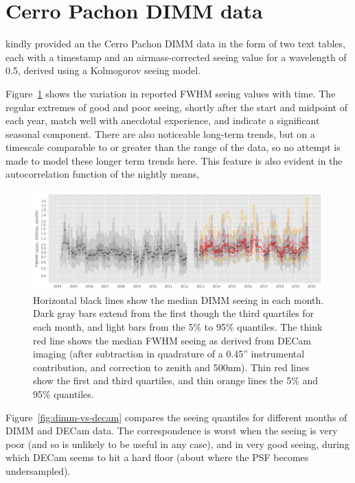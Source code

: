 \documentclass[\docopts]{\docclass}
\begin{document}
\section{Cerro Pachon DIMM data}
\label{sec:dimm}

\cite{ebustos} kindly provided an the Cerro Pachon DIMM data in the
form of two text tables, each with a timestamp and an
airmass-corrected seeing value for a wavelength of 0.5\micron,
derived using a Kolmogorov seeing model.

Figure~\ref{fig:monthly-dimm-vs-year} shows the variation in
reported FWHM seeing values with time. The regular extremes of good
and poor seeing, shortly after the start and midpoint of each year,
match well with anecdotal experience, and indicate a significant
seasonal component. There are also noticeable long-term trends, but on
a timescale comparable to or greater than the range of the data, so no
attempt is made to model these longer term trends here. This feature
is also evident in the autocorrelation function of the nightly means,

\begin{figure}
  \includegraphics[width=\columnwidth]{monthly_dimm_vs_year.png}
  \caption{
    Horizontal black lines show the median DIMM seeing in each
    month. Dark gray bars extend from the first though the third
    quartiles for each month, and light bars from the 5\% to 95\%
    quantiles.
    The think red line shows the median FWHM seeing as derived from
    DECam imaging (after subtraction in quadrature of a 0.45''
    instrumental contribution, and correction to zenith and
    500nm). Thin red lines show the first and third quartiles, and
    thin orange lines the 5\% and 95\% quantiles.
    }
  \label{fig:monthly-dimm-vs-year}
\end{figure}


Figure~\ref{fig:dimm-vs-decam} compares the seeing quantiles for
different months of DIMM and DECam data. The correspondence is worst
when the seeing is very poor (and so is unlikely to be useful in any
case), and in very good seeing, during which DECam seems to hit a hard
floor (about where the PSF becomes undersampled).
\end{document}
